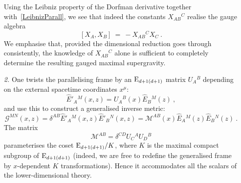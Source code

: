 \documentclass[debug]{phd}
\begin{document}
\begin{itemize}
									Using the Leibniz property of the Dorfman derivative together with~\eqref{LeibnizParall}, we see that indeed the constants $X_{AB}{}^C$ realise the gauge algebra
											\begin{equation}\label{eq:gauge-alg-X}
												[X_A,X_B] \ = \ -X_{AB}{}^C X_C\ .
											\end{equation}
									We emphasise that, provided the dimensional reduction goes through consistently, the knowledge of $X_{AB}{}^C$ alone is sufficient to completely determine the resulting gauged maximal supergravity.
					\item[\textit{2.}] One twists the parallelising frame by an $\mathrm{E}_{d+1(d+1)}$ matrix $U_A{}^B$ depending on the external spacetime coordinates $x^\mu$:
											\begin{equation}
												\hat E'_A{}^M(x,z) = U_A{}^B(x)\hat E_B{}^M(z)\ ,
											\end{equation}
									and use this to construct a generalised inverse metric:
											\begin{equation}\label{invG_from_parall}
												\mathcal{G}^{MN}(x,z) = \delta^{AB}\hat E'_A{}^M (x,z) \hat E'_B{}^N (x,z) = \mathcal{M}^{AB}(x) \hat E_A{}^M(z) \hat E_B{}^N(z)\ .
											\end{equation}
									The matrix 
											\begin{equation}
												\mathcal{M}^{AB} = \delta^{CD}U_C{}^A U_D{}^B
											\end{equation}
									parameterises the coset $\mathrm{E}_{d+1(d+1)}/K$, where $K$ is the maximal compact subgroup of $\mathrm{E}_{d+1(d+1)}$ (indeed, we are free to redefine the generalised frame by $x$-dependent $K$ transformations). 
									Hence it accommodates all the scalars of the lower-dimensional theory.


\end{itemize}
\end{document}
